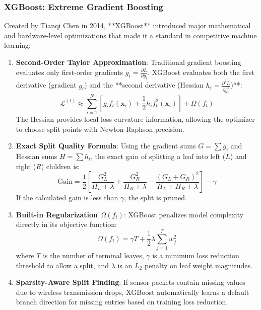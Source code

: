 \subsubsection{XGBoost: Extreme Gradient Boosting}
Created by Tianqi Chen in 2014, **XGBoost** introduced major mathematical and hardware-level optimizations that made it a standard in competitive machine learning:
\begin{enumerate}
    \item \textbf{Second-Order Taylor Approximation}: Traditional gradient boosting evaluates only first-order gradients $g_i = \frac{\partial L}{\partial \hat{y}_i}$. XGBoost evaluates both the first derivative (gradient $g_i$) and the **second derivative (Hessian $h_i = \frac{\partial^2 L}{\partial \hat{y}_i^2}$)**:
    \begin{equation}
    \mathcal{L}^{(t)} \approx \sum_{i=1}^{N} \left[ g_i f_t(\mathbf{x}_i) + \frac{1}{2} h_i f_t^2(\mathbf{x}_i) \right] + \Omega(f_t)\label{eq:xgboost_objective}
    \end{equation}
    The Hessian provides local loss curvature information, allowing the optimizer to choose split points with Newton-Raphson precision.
    \item \textbf{Exact Split Quality Formula}: Using the gradient sums $G = \sum g_i$ and Hessian sums $H = \sum h_i$, the exact gain of splitting a leaf into left ($L$) and right ($R$) children is:
    \begin{equation}
    \text{Gain} = \frac{1}{2} \left[ \frac{G_L^2}{H_L + \lambda} + \frac{G_R^2}{H_R + \lambda} - \frac{(G_L + G_R)^2}{H_L + H_R + \lambda} \right] - \gamma\label{eq:xgboost_split_gain}
    \end{equation}
    If the calculated gain is less than $\gamma$, the split is pruned.
    \item \textbf{Built-in Regularization $\Omega(f_t)$}: XGBoost penalizes model complexity directly in its objective function:
    \begin{equation}
    \Omega(f_t) = \gamma T + \frac{1}{2} \lambda \sum_{j=1}^{T} w_j^2\label{eq:xgboost_regularization}
    \end{equation}
    where $T$ is the number of terminal leaves, $\gamma$ is a minimum loss reduction threshold to allow a split, and $\lambda$ is an $L_2$ penalty on leaf weight magnitudes.
    \item \textbf{Sparsity-Aware Split Finding}: If sensor packets contain missing values due to wireless transmission drops, XGBoost automatically learns a default branch direction for missing entries based on training loss reduction.
\end{enumerate}

